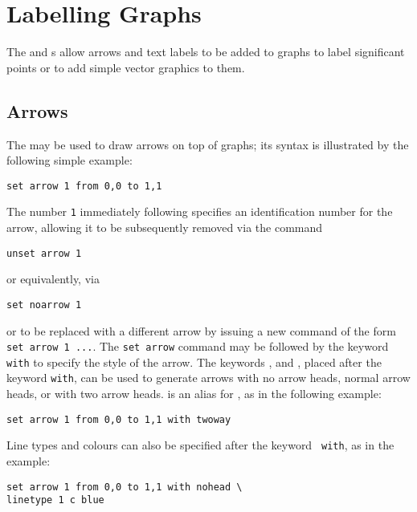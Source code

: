 \section{Labelling Graphs}

The  and s allow arrows and text labels
to be added to graphs to label significant points or to add simple vector
graphics to them.

\subsection{Arrows}

\label{sec:set_arrow} The  may be used to
draw arrows on top of graphs; its syntax is illustrated by the following simple
example:

\begin{verbatim}
set arrow 1 from 0,0 to 1,1
\end{verbatim}

\noindent The number {\tt 1} immediately following 
specifies an identification number for the arrow, allowing it to be
subsequently removed via the command

\begin{verbatim}
unset arrow 1
\end{verbatim}

\noindent or equivalently, via

\begin{verbatim}
set noarrow 1
\end{verbatim}

\noindent or to be replaced with a different arrow by issuing a new command of
the form {\tt set arrow 1~...}.  The {\tt set arrow} command may be followed by
the keyword {\tt with} to specify the style of the arrow. The keywords
,  and , placed after the
keyword {\tt with}, can be used to generate arrows with no arrow heads, normal
arrow heads, or with two arrow heads.   is an alias for
, as in the following example:

\begin{verbatim}
set arrow 1 from 0,0 to 1,1 with twoway
\end{verbatim}

\noindent Line types and colours can also be specified after the keyword {\tt
with}, as in the example:

\begin{verbatim}
set arrow 1 from 0,0 to 1,1 with nohead \
linetype 1 c blue
\end{verbatim}

